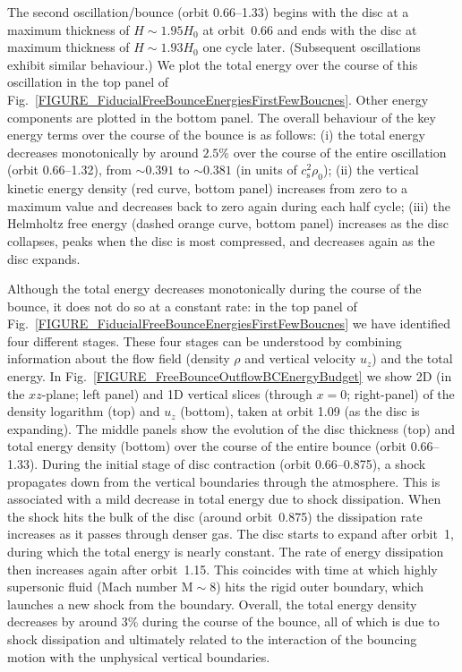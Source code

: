 \documentclass[fleqn,usenatbib]{mnras}
\begin{document}
The second oscillation/bounce (orbit 0.66--1.33) begins with the disc at a maximum thickness of $H \sim 1.95H_0$ at orbit~0.66 and ends with the disc at maximum thickness of $H \sim 1.93H_0$ one cycle later. (Subsequent oscillations exhibit similar behaviour.) We plot the total energy over the course of this oscillation in the top panel of Fig.~\ref{FIGURE_FiducialFreeBounceEnergiesFirstFewBoucnes}. Other energy components are plotted in the bottom panel. The overall behaviour of the key energy terms over the course of the bounce is as follows: (i) the total energy decreases monotonically by around $2.5\%$ over the course of the entire oscillation (orbit 0.66--1.32), from $\sim 0.391$ to $\sim 0.381$ (in units of $c_\text{s}^2 \rho_0$); %
(ii) the vertical kinetic energy density (red curve, bottom panel) increases from zero to a maximum value and decreases back to zero again during each half cycle; (iii) the Helmholtz free energy (dashed orange curve, bottom panel) increases as the disc collapses, peaks when the disc is most compressed, and decreases again as the disc expands.

Although the total energy decreases monotonically during the course of the bounce, it does not do so at a constant rate: in the top panel of Fig.~\ref{FIGURE_FiducialFreeBounceEnergiesFirstFewBoucnes} we have identified four different stages. These four stages can be understood by combining information about the flow field (density $\rho$ and vertical velocity $u_z$) and the total energy. In Fig.~\ref{FIGURE_FreeBounceOutflowBCEnergyBudget} we show 2D (in the $xz$-plane; left panel) and 1D vertical slices (through $x=0$; right-panel) of the density logarithm (top) and $u_z$ (bottom), taken at orbit 1.09 (as the disc is expanding). The middle panels show the evolution of the disc thickness (top) and total energy density (bottom) over the course of the entire bounce (orbit 0.66--1.33). During the initial stage of disc contraction (orbit 0.66--0.875), a shock propagates down from the vertical boundaries through the atmosphere. This is associated with a mild decrease in total energy due to shock dissipation. When the shock hits the bulk of the disc (around orbit~0.875) the dissipation rate increases as it passes through denser gas. The disc starts to expand after orbit~1, during which the total energy is nearly constant. The rate of energy dissipation then increases again after orbit~1.15. This coincides with time at which highly supersonic fluid (Mach number $\text{M}\sim8$) hits the rigid outer boundary, which launches a new shock from the boundary. Overall, the total energy density decreases by around $3\%$ during the course of the bounce, all of which is due to shock dissipation and ultimately related to the interaction of the bouncing motion with the unphysical vertical boundaries.
\end{document}
